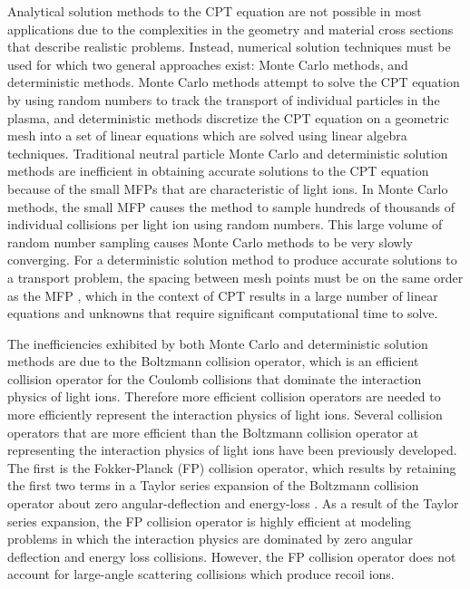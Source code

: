 \documentclass[../main.tex]{subfiles}
\begin{document}
Analytical solution methods to the CPT equation are not possible in most applications due to the complexities in the geometry and material cross sections that describe realistic problems. Instead, numerical solution techniques must be used for which two general approaches exist: Monte Carlo methods, and deterministic methods. Monte Carlo methods attempt to solve the CPT equation by using random numbers to track the transport of individual particles in the plasma, and deterministic methods discretize the CPT equation on a geometric mesh into a set of linear equations which are solved using linear algebra techniques. Traditional neutral particle Monte Carlo and deterministic solution methods are inefficient in obtaining accurate solutions to the CPT equation because of the small MFPs that are characteristic of light ions. In Monte Carlo methods, the small MFP causes the method to sample hundreds of thousands of individual collisions per light ion using random numbers. This large volume of random number sampling causes Monte Carlo methods to be very slowly converging. For a deterministic solution method to produce accurate solutions to a transport problem, the spacing between mesh points must be on the same order as the MFP \cite{Larsen-1999}, which in the context of CPT results in a large number of linear equations and unknowns that require significant computational time to solve. 

The inefficiencies exhibited by both Monte Carlo and deterministic solution methods are due to the Boltzmann collision operator, which is an efficient collision operator for the Coulomb collisions that dominate the interaction physics of light ions. Therefore more efficient collision operators are needed to more efficiently represent the interaction physics of light ions. Several collision operators that are more efficient than the Boltzmann collision operator at representing the interaction physics of light ions have been previously developed. The first is the Fokker-Planck (FP) collision operator, which results by retaining the first two terms in a Taylor series expansion of the Boltzmann collision operator about zero angular-deflection and energy-loss \cite{Pomraning-1996}. As a result of the Taylor series expansion, the FP collision operator is highly efficient at modeling problems in which the interaction physics are dominated by zero angular deflection and energy loss collisions. However, the FP collision operator does not account for large-angle scattering collisions which produce recoil ions. 
\end{document}
